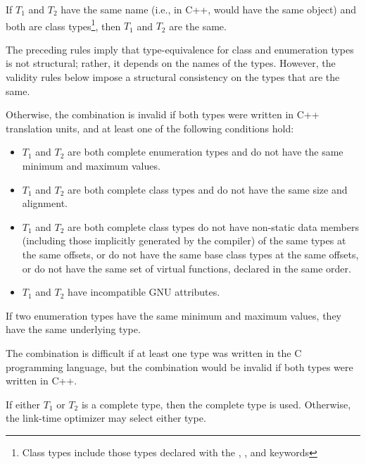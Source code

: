 If $T_1$ and $T_2$ have the same name (i.e., in C++, would have the
same  object) and both are class 
types\footnote{Class types include those types
  declared with the , , and 
  keywords},  
then $T_1$ and $T_2$ are the same.

\begin{note}
  The preceding rules imply that type-equivalence for class and
  enumeration types is not structural; rather, it depends on the names
  of the types.  However, the validity rules below impose a structural
  consistency on the types that are the same.
\end{note}

Otherwise, the combination is invalid if both types were written in
C++ translation units, and at least one of the following conditions hold:
\begin{itemize}
\item $T_1$ and $T_2$ are both complete enumeration types and do not have
  the same minimum and maximum values.

\item $T_1$ and $T_2$ are both complete class types and do not have the same
  size and alignment.

\item $T_1$ and $T_2$ are both complete class types do not have non-static
  data members (including those implicitly generated by the compiler)
  of the same types at the same offsets, or do not have the same base
  class types at the same offsets, or do not have the same set of
  virtual functions, declared in the same order.

\item $T_1$ and $T_2$ have incompatible GNU attributes.
\end{itemize}

\begin{note}
If two enumeration types have the same minimum and maximum values,
they have the same underlying type.
\end{note}

The combination is difficult if at least one type was written in the C
programming language, but the combination would be invalid if both
types were written in C++.

If either $T_1$ or $T_2$ is a complete type, then the complete type is
used.  Otherwise, the link-time optimizer may select either type.

